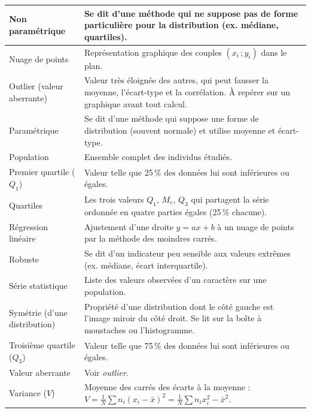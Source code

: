\documentclass[11pt,a4paper]{article}
\begin{document}
{\begin{longtable}{|p{3cm}|p{12.5cm}|}
\hline
Non paramétrique & Se dit d'une méthode qui ne suppose pas de forme particulière pour la distribution (ex. médiane, quartiles). \\
\hline
Nuage de points & Représentation graphique des couples $(x_i\,;y_i)$ dans le plan. \\
\hline
Outlier (valeur aberrante) & Valeur très éloignée des autres, qui peut fausser la moyenne, l'écart-type et la corrélation. À repérer sur un graphique avant tout calcul. \\
\hline
Paramétrique & Se dit d'une méthode qui suppose une forme de distribution (souvent normale) et utilise moyenne et écart-type. \\
\hline
Population & Ensemble complet des individus étudiés. \\
\hline
Premier quartile ($Q_1$) & Valeur telle que 25\,\% des données lui sont inférieures ou égales. \\
\hline
Quartiles & Les trois valeurs $Q_1$, $M_e$, $Q_3$ qui partagent la série ordonnée en quatre parties égales (25\,\% chacune). \\
\hline
Régression linéaire & Ajustement d'une droite $y = ax + b$ à un nuage de points par la méthode des moindres carrés. \\
\hline
Robuste & Se dit d'un indicateur peu sensible aux valeurs extrêmes (ex. médiane, écart interquartile). \\
\hline
Série statistique & Liste des valeurs observées d'un caractère sur une population. \\
\hline
Symétrie (d'une distribution) & Propriété d'une distribution dont le côté gauche est l'image miroir du côté droit. Se lit sur la boîte à moustaches ou l'histogramme. \\
\hline
Troisième quartile ($Q_3$) & Valeur telle que 75\,\% des données lui sont inférieures ou égales. \\
\hline
Valeur aberrante & Voir \emph{outlier}. \\
\hline
Variance ($V$) & Moyenne des carrés des écarts à la moyenne : $V = \frac{1}{N}\sum n_i(x_i-\bar{x})^2 = \frac{1}{N}\sum n_i x_i^2 - \bar{x}^2$. \\
\hline
\end{longtable}
}

\vspace{0.3cm}
\end{document}
